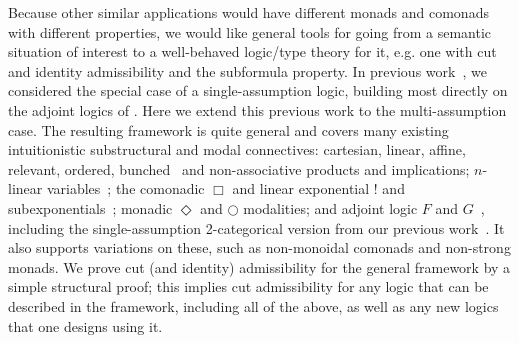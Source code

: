 Because other similar applications would have different monads and
comonads with different properties, we would like general tools for
going from a semantic situation of interest to a well-behaved logic/type
theory for it, e.g. one with cut and identity admissibility and the
subformula property. In previous work~\citep{ls16adjoint}, we considered
the special case of a single-assumption logic, building most directly on
the adjoint logics of
\citet{benton94mixed,bentonwadler96adjoint,reed09adjoint}.  Here we
extend this previous work to the multi-assumption case.  The resulting
framework is quite general and covers many existing intuitionistic
substructural and modal connectives: cartesian, linear, affine,
relevant, ordered, bunched~\citep{ohearnpym99bunched} and
non-associative products and implications; $n$-linear
variables~\citep{reed08namessubstructural}; the comonadic $\Box$ and
linear exponential $!$ and
subexponentials~\citep{nigammiller09subexponentials,danos+93subexponentials};
monadic $\Diamond$ and $\bigcirc$ modalities; and adjoint logic $F$ and
$G$~\citep{benton94mixed,bentonwadler96adjoint,reed09adjoint}, including
the single-assumption 2-categorical version from our previous
work~\citep{ls16adjoint}.  It also supports variations on these, such as
non-monoidal comonads and non-strong monads.  We prove cut (and
identity) admissibility for the general framework by a simple
structural
proof; this implies cut admissibility
for any logic that can be described in the framework, including all of
the above, as well as any new logics that one designs using it.


